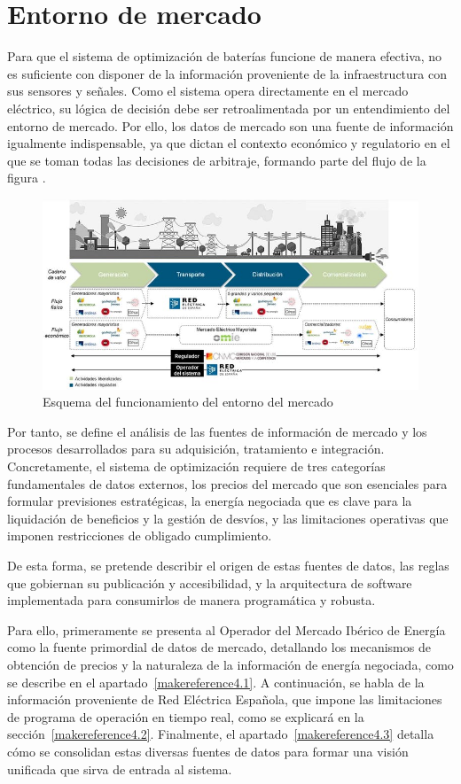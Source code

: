 \cleardoublepage

\chapter{Entorno de mercado}
\label{makereference4}

Para que el sistema de optimización de baterías funcione de manera efectiva, no es suficiente con disponer de la información proveniente de la infraestructura con sus sensores y señales. Como el sistema opera directamente en el mercado eléctrico, su lógica de decisión debe ser retroalimentada por un entendimiento del entorno de mercado. Por ello, los datos de mercado son una fuente de información igualmente indispensable, ya que dictan el contexto económico y regulatorio en el que se toman todas las decisiones de arbitraje, formando parte del flujo de la figura .

\begin{figure}
  \centering
  \includegraphics[width=0.5\linewidth]{figures/esquema-mercado.jpg}
  \caption{Esquema del funcionamiento del entorno del mercado}
  \label{fig:esquema-mercado}
\end{figure}

Por tanto, se define el análisis de las fuentes de información de mercado y los procesos desarrollados para su adquisición, tratamiento e integración. Concretamente, el sistema de optimización requiere de tres categorías fundamentales de datos externos, los precios del mercado que son esenciales para formular previsiones estratégicas, la energía negociada que es clave para la liquidación de beneficios y la gestión de desvíos, y las limitaciones operativas que imponen restricciones de obligado cumplimiento.

De esta forma, se pretende describir el origen de estas fuentes de datos, las reglas que gobiernan su publicación y accesibilidad, y la arquitectura de software implementada para consumirlos de manera programática y robusta.

Para ello, primeramente se presenta al Operador del Mercado Ibérico de Energía como la fuente primordial de datos de mercado, detallando los mecanismos de obtención de precios y la naturaleza de la información de energía negociada, como se describe en el apartado~\ref{makereference4.1}. A continuación, se habla de la información proveniente de Red Eléctrica Española, que impone las limitaciones de programa de operación en tiempo real, como se explicará en la sección~\ref{makereference4.2}. Finalmente, el apartado~\ref{makereference4.3} detalla cómo se consolidan estas diversas fuentes de datos para formar una visión unificada que sirva de entrada al sistema.

